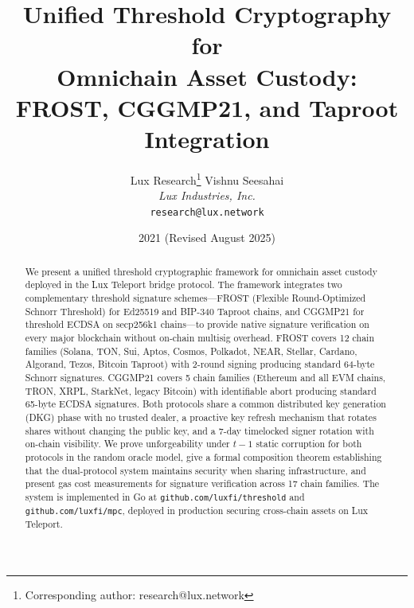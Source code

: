 \documentclass[11pt,twocolumn]{article}
\title{\textbf{Unified Threshold Cryptography for\\Omnichain Asset Custody:\\FROST, CGGMP21, and Taproot Integration}}
\author{
Lux Research\thanks{Corresponding author: research@lux.network}
\quad
Vishnu Seesahai\\
\textit{Lux Industries, Inc.}\\
\texttt{research@lux.network}
}
\date{2021 (Revised August 2025)}
\begin{document}
\luxcoverpage

\begin{abstract}
We present a unified threshold cryptographic framework for omnichain asset custody
deployed in the Lux Teleport bridge protocol. The framework integrates two complementary
threshold signature schemes---FROST (Flexible Round-Optimized Schnorr Threshold) for
Ed25519 and BIP-340 Taproot chains, and CGGMP21 for threshold ECDSA on secp256k1
chains---to provide native signature verification on every major blockchain without
on-chain multisig overhead. FROST covers 12 chain families (Solana, TON, Sui, Aptos,
Cosmos, Polkadot, NEAR, Stellar, Cardano, Algorand, Tezos, Bitcoin Taproot) with
2-round signing producing standard 64-byte Schnorr signatures. CGGMP21 covers 5 chain
families (Ethereum and all EVM chains, TRON, XRPL, StarkNet, legacy Bitcoin) with
identifiable abort producing standard 65-byte ECDSA signatures. Both protocols share a
common distributed key generation (DKG) phase with no trusted dealer, a proactive key
refresh mechanism that rotates shares without changing the public key, and a 7-day
timelocked signer rotation with on-chain visibility. We prove unforgeability under
$t-1$ static corruption for both protocols in the random oracle model, give a formal
composition theorem establishing that the dual-protocol system maintains security when
sharing infrastructure, and present gas cost measurements for signature verification
across 17 chain families. The system is implemented in Go at
\texttt{github.com/luxfi/threshold} and \texttt{github.com/luxfi/mpc}, deployed in
production securing cross-chain assets on Lux Teleport.
\end{abstract}















\end{document}
